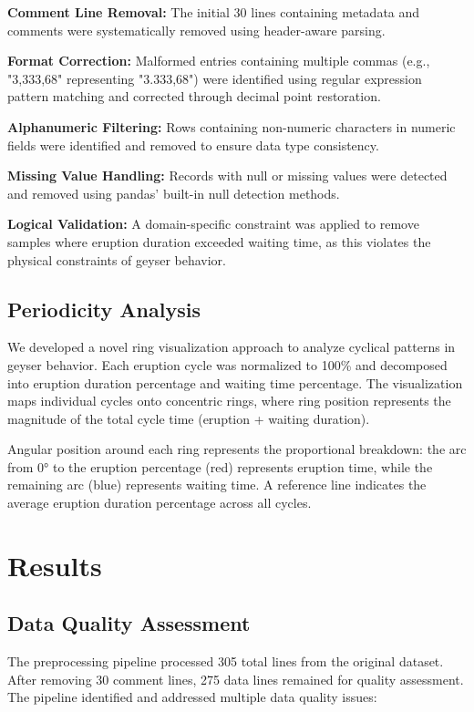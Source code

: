 \documentclass[fleqn,10pt]{olplainarticle}
\begin{document}
\textbf{Comment Line Removal:} The initial 30 lines containing metadata and comments were systematically removed using header-aware parsing.

\textbf{Format Correction:} Malformed entries containing multiple commas (e.g., "3,333,68" representing "3.333,68") were identified using regular expression pattern matching and corrected through decimal point restoration.

\textbf{Alphanumeric Filtering:} Rows containing non-numeric characters in numeric fields were identified and removed to ensure data type consistency.

\textbf{Missing Value Handling:} Records with null or missing values were detected and removed using pandas' built-in null detection methods.

\textbf{Logical Validation:} A domain-specific constraint was applied to remove samples where eruption duration exceeded waiting time, as this violates the physical constraints of geyser behavior.

\subsection*{Periodicity Analysis}
We developed a novel ring visualization approach to analyze cyclical patterns in geyser behavior. Each eruption cycle was normalized to 100\% and decomposed into eruption duration percentage and waiting time percentage. The visualization maps individual cycles onto concentric rings, where ring position represents the magnitude of the total cycle time (eruption + waiting duration).

Angular position around each ring represents the proportional breakdown: the arc from 0° to the eruption percentage (red) represents eruption time, while the remaining arc (blue) represents waiting time. A reference line indicates the average eruption duration percentage across all cycles.

\section*{Results}

\subsection*{Data Quality Assessment}
The preprocessing pipeline processed 305 total lines from the original dataset. After removing 30 comment lines, 275 data lines remained for quality assessment. The pipeline identified and addressed multiple data quality issues:
\end{document}

